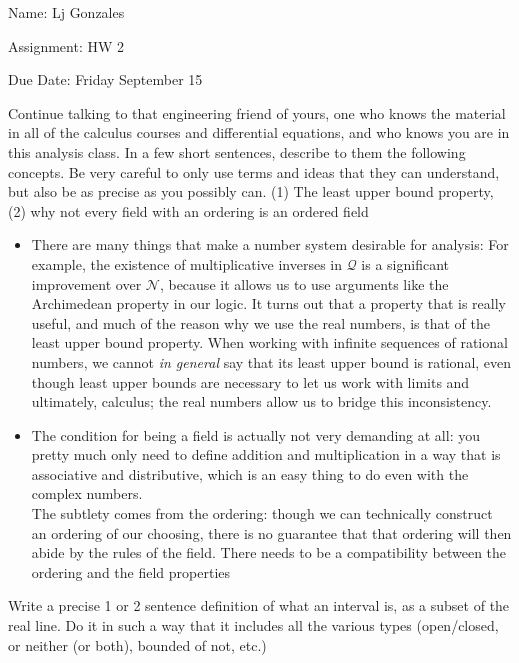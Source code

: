 \documentclass[11 pt]{article}
\begin{document}
    Name: Lj Gonzales

    Assignment: HW 2

    Due Date: Friday September 15
    \break
\begin{problem}
	Continue talking to that engineering friend of yours, one who knows
the material in all of the calculus courses and differential equations, and who knows
you are in this analysis class. In a few short sentences, describe to them the following
concepts. Be very careful to only use terms and ideas that they can understand, but
also be as precise as you possibly can.
(1) The least upper bound property,
(2) why not every field with an ordering is an ordered field
\end{problem}
\begin{solution}
	\begin{itemize}
		\item There are many things that make a number system desirable for analysis: For example, the existence of multiplicative inverses in $\mathcal{Q}$ is a significant improvement over $\mathcal{N}$, because it allows us to use arguments like the Archimedean property in our logic.
		It turns out that a property that is really useful, and much of the reason why we use the real numbers, is that of the least upper bound property. When working with infinite sequences of rational numbers, we cannot \emph{in general} say that its least upper bound is rational, even though least upper bounds are necessary to let us work with limits and ultimately, calculus; the real numbers allow us to bridge this inconsistency.
		\break
	\item The condition for being a field is actually not very demanding at all: you pretty much only need to define addition and multiplication in a way that is associative and distributive, which is an easy thing to do even with the complex numbers.\\
	The subtlety comes from the ordering: though we can technically construct an ordering of our choosing, there is no guarantee that that ordering will then abide by the rules of the field. There needs to be a compatibility between the ordering and the field properties
	\end{itemize}
\end{solution} 
\pagebreak
\begin{problem}
	Write a precise 1 or 2 sentence definition of what an interval is, as a subset of the real line.  Do it in such a way that it includes all the various types (open/closed, or neither (or both), bounded of not, etc.)  
\end{problem}
\end{document}
